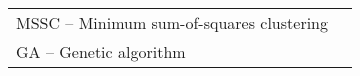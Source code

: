 \begin{thenotations}

  \noindent
  \begin{tabular}{ll}
    MSSC -- Minimum sum-of-squares clustering\\
    GA -- Genetic algorithm\\
  \end{tabular}
  
\end{thenotations}
